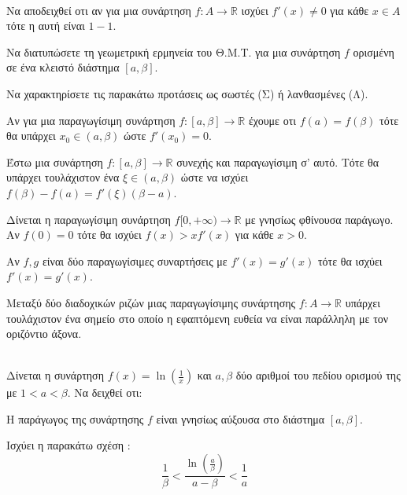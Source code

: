 \documentclass[ektypwsh]{diag-pan-xelatex}
\begin{document}
\begin{thema}
\item\mbox{}\\\vspace{-5mm}
\begin{erwthma}
\item Να αποδειχθεί οτι αν για μια συνάρτηση $ f:A\rightarrow\mathbb{R} $ ισχύει $ f'(x)\neq0 $ για κάθε $ x\in A $ τότε η αυτή είναι $ 1-1 $.
\item Να διατυπώσετε τη γεωμετρική ερμηνεία του Θ.Μ.Τ. για μια συνάρτηση $ f $ ορισμένη σε ένα κλειστό διάστημα $ [a,\beta] $.
\item Να χαρακτηρίσετε τις παρακάτω προτάσεις ως σωστές (Σ) ή λανθασμένες (Λ).
\begin{rlist}
\item Αν για μια παραγωγίσιμη συνάρτηση $ f:[a,\beta]\rightarrow\mathbb{R} $ έχουμε οτι $ f(a)=f(\beta) $ τότε θα υπάρχει $ x_0\in(a,\beta) $ ώστε $ f'(x_0)=0 $.
\item Έστω μια συνάρτηση $ f:[a,\beta]\rightarrow\mathbb{R} $ συνεχής και παραγωγίσιμη σ' αυτό. Τότε θα υπάρχει τουλάχιστον ένα $ \xi\in(a,\beta) $ ώστε να ισχύει $ f(\beta)-f(a)=f'(\xi)(\beta-a) $.
\item Δίνεται η παραγωγίσιμη συνάρτηση $ f[0,+\infty)\rightarrow\mathbb{R} $ με γνησίως φθίνουσα παράγωγο. Αν $ f(0)=0 $ τότε θα ισχύει $ f(x)>xf'(x) $ για κάθε $ x>0 $.
\item Αν $ f,g $ είναι δύο παραγωγίσιμες συναρτήσεις με $ f'(x)=g'(x) $ τότε θα ισχύει $ f'(x)=g'(x) $.
\item Μεταξύ δύο διαδοχικών ριζών μιας παραγωγίσιμης συνάρτησης $ f:A\rightarrow\mathbb{R} $ υπάρχει τουλάχιστον ένα σημείο στο οποίο η εφαπτόμενη ευθεία να είναι παράλληλη με τον οριζόντιο άξονα.\\
\end{rlist}
\end{erwthma}
\item\mbox{}\\
Δίνεται η συνάρτηση $ f(x)=\ln\left( \frac{1}{x}\right)  $ και $ a,\beta $ δύο αριθμοί του πεδίου ορισμού της με $ 1<a<\beta $. Να δειχθεί οτι:
\begin{erwthma}
\item H παράγωγος της συνάρτησης $ f $ είναι γνησίως αύξουσα στο διάστημα $ [a,\beta] $.
\item Ισχύει η παρακάτω σχέση :
\[ \frac{1}{\beta}<\frac{\ln\left(\frac{a}{\beta}\right) }{a-\beta}<\frac{1}{a} \]

\end{erwthma}
\end{thema}
\end{document}
